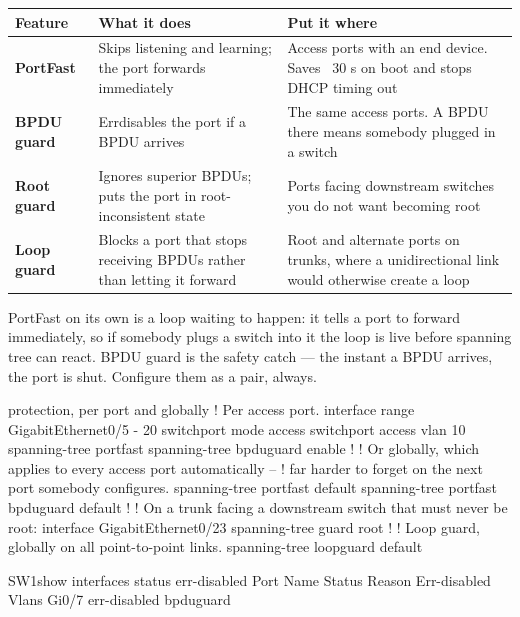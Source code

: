 \begin{longtable}{@{}L{2.8cm}L{5.6cm}L{6.6cm}@{}}
\toprule
{}
\textbf{Feature} & \textbf{What it does} & \textbf{Put it where} \\
\midrule
\endhead
\textbf{PortFast} & Skips listening and learning; the port forwards immediately &
Access ports with an end device. Saves ~30 s on boot and stops DHCP timing out \\
\textbf{BPDU guard} & Errdisables the port if a BPDU arrives &
The same access ports. A BPDU there means somebody plugged in a switch \\
\textbf{Root guard} & Ignores superior BPDUs; puts the port in root-inconsistent
state & Ports facing downstream switches you do not want becoming root \\
\textbf{Loop guard} & Blocks a port that stops receiving BPDUs rather than
letting it forward & Root and alternate ports on trunks, where a unidirectional
link would otherwise create a loop \\
\bottomrule
\end{longtable}

\begin{alertbox}
PortFast on its own is a loop waiting to happen: it tells a port to forward
immediately, so if somebody plugs a switch into it the loop is live before
spanning tree can react. BPDU guard is the safety catch --- the instant a BPDU
arrives, the port is shut. Configure them as a pair, always.
\end{alertbox}

\begin{config}{protection, per port and globally}
! Per access port.
interface range GigabitEthernet0/5 - 20
 switchport mode access
 switchport access vlan 10
 spanning-tree portfast
 spanning-tree bpduguard enable
!
! Or globally, which applies to every access port automatically --
! far harder to forget on the next port somebody configures.
spanning-tree portfast default
spanning-tree portfast bpduguard default
!
! On a trunk facing a downstream switch that must never be root:
interface GigabitEthernet0/23
 spanning-tree guard root
!
! Loop guard, globally on all point-to-point links.
spanning-tree loopguard default
\end{config}

\begin{verify}{SW1}{show interfaces status err-disabled}
Port      Name               Status       Reason               Err-disabled Vlans
Gi0/7                        err-disabled bpduguard
\end{verify}

